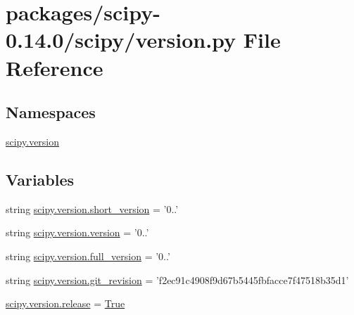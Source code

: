 \hypertarget{scipy-0_814_80_2scipy_2version_8py}{}\section{packages/scipy-\/0.14.0/scipy/version.py File Reference}
\label{scipy-0_814_80_2scipy_2version_8py}
\subsection*{Namespaces}
\begin{DoxyCompactItemize}
\item 
 \hyperlink{namespacescipy_1_1version}{scipy.\+version}
\end{DoxyCompactItemize}
\subsection*{Variables}
\begin{DoxyCompactItemize}
\item 
string \hyperlink{namespacescipy_1_1version_a80df851cbce5d39fb5774261e2ddcd5f}{scipy.\+version.\+short\+\_\+version} = '0..'
\item 
string \hyperlink{namespacescipy_1_1version_aa72a021287c47d0c25b60e74640a97ac}{scipy.\+version.\+version} = '0..'
\item 
string \hyperlink{namespacescipy_1_1version_ad9b41ddb84e9eae26c237e199a7ca106}{scipy.\+version.\+full\+\_\+version} = '0..'
\item 
string \hyperlink{namespacescipy_1_1version_adc5f843f3f8dc4792d9817e240c36945}{scipy.\+version.\+git\+\_\+revision} = 'f2ec91c4908f9d67b5445fbfacce7f47518b35d1'
\item 
\hyperlink{namespacescipy_1_1version_a8d7188c228363203bc4d76956fd9b9b5}{scipy.\+version.\+release} = \hyperlink{libqhull_8h_add3ca9eefe3b5b754426f51d3043e579}{True}
\end{DoxyCompactItemize}
